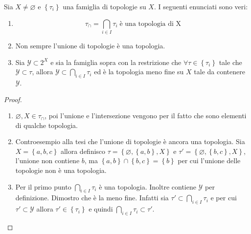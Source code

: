 \begin{proposition}
	Sia $X \neq \varnothing$ e $\left\{\tau_i\right\}$ una famiglia di topologie su $X$. I seguenti enunciati sono veri:
	\begin{enumerate}
		\item 
		\begin{equation*}
			\tau_\cap = \bigcap_{i \in I} \tau_i \; \text{è una topologia di X} 
		\end{equation*}
		\item Non sempre l'unione di topologie è una topologia.
		\item Sia $\mathcal{Y} \subset 2^X$ e sia la famiglia sopra con la restrizione che $\forall \tau \in \left\{\tau_i\right\}$ tale che $\mathcal{Y} \subset \tau$, allora $\mathcal{Y} \subset \bigcap_{i \in I} \tau_i $ ed è la topologia meno fine su $X$ tale da contenere $\mathcal{Y}$.
	\end{enumerate}
\end{proposition}
\begin{proof}
	\begin{enumerate}
		\item $\varnothing, X \in \tau_\cap$, poi l'unione e l'intersezione vengono per il fatto che sono elementi di qualche topologia.
		\item Controesempio alla tesi che l'unione di topologie è ancora una topologia. Sia $X = \left\{a,b,c\right\}$ allora definisco $\tau = \left\{\varnothing, \left\{a,b\right\}, X\right\}$ e $\tau' = \left\{\varnothing, \left\{b,c\right\}, X\right\}$, l'unione non contiene $b$, ma $\left\{a,b\right\} \cap \left\{b,c\right\} = \left\{b\right\}$ per cui l'unione delle topologie non è una topologia.
		\item Per il primo punto $\bigcap_{i \in I} \tau_i$ è una topologia. Inoltre contiene $\mathcal{Y}$ per definizione. Dimostro che è la meno fine. Infatti sia $\tau' \subset \bigcap_{i \in I} \tau_i$ e per cui $\tau' \subset \mathcal{Y}$ allora $\tau' \in \left\{\tau_i\right\}$ e quindi $\bigcap_{i \in I} \tau_i \subset \tau'$. 
	\end{enumerate}	
\end{proof}

